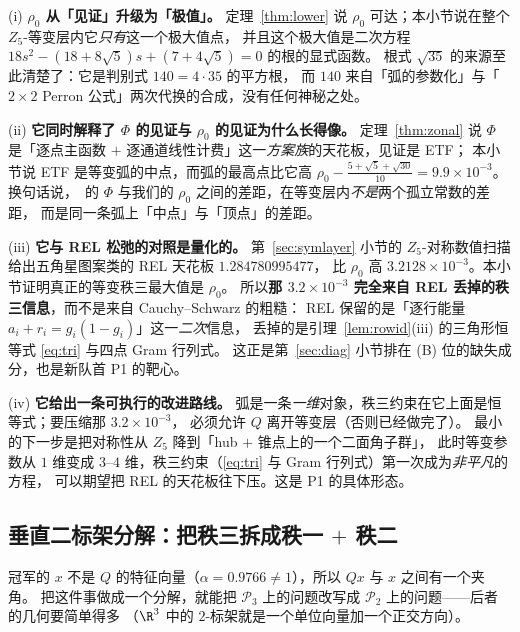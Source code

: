 \begin{remark}[这条定理在主线上意味着什么]\label{rmk:coneread}
(i) \textbf{$\rho_0$ 从「见证」升级为「极值」。}
定理~\ref{thm:lower} 说 $\rho_0$ 可达；本小节说在整个 $Z_5$-等变层内它\emph{只有}这一个极大值点，
并且这个极大值是二次方程 $18s^2-(18+8\sqrt5)s+(7+4\sqrt5)=0$ 的根的显式函数。
根式 $\sqrt{35}$ 的来源至此清楚了：它是判别式 $140=4\cdot35$ 的平方根，
而 $140$ 来自「弧的参数化」与「$2\times2$ Perron 公式」两次代换的合成，没有任何神秘之处。

(ii) \textbf{它同时解释了 $\Phi$ 的见证与 $\rho_0$ 的见证为什么长得像。}
定理~\ref{thm:zonal} 说 $\Phi$ 是「逐点主函数 $+$ 逐通道线性计费」这一\emph{方案族}的天花板，见证是 ETF；
本小节说 ETF 是等变弧的中点，而弧的最高点比它高 $\rho_0-\frac{5+\sqrt5+\sqrt{30}}{10}=9.9\times10^{-3}$。
换句话说，\STW\ 的 $\Phi$ 与我们的 $\rho_0$ 之间的差距，在等变层内\emph{不是}两个孤立常数的差距，
而是同一条弧上「中点」与「顶点」的差距。

(iii) \textbf{它与 REL 松弛的对照是量化的。}
第~\ref{sec:symlayer} 小节的 $Z_5$-对称数值扫描给出五角星图案类的 REL 天花板 $1.284780995477$，
比 $\rho_0$ 高 $3.2128\times10^{-3}$。本小节证明真正的等变秩三最大值是 $\rho_0$。
所以\textbf{那 $3.2\times10^{-3}$ 完全来自 REL 丢掉的秩三信息}，而不是来自 Cauchy--Schwarz 的粗糙：
REL 保留的是「逐行能量 $a_i+r_i=g_i(1-g_i)$」这一\emph{二次}信息，
丢掉的是引理~\ref{lem:rowid}(iii) 的三角形恒等式 \eqref{eq:tri} 与四点 Gram 行列式。
这正是第~\ref{sec:diag} 小节排在 (B) 位的缺失成分，也是新队首 P1 的靶心。

(iv) \textbf{它给出一条可执行的改进路线。}
弧是一条\emph{一维}对象，秩三约束在它上面是恒等式；要压缩那 $3.2\times10^{-3}$，
必须允许 $Q$ 离开等变层（否则已经做完了）。
最小的下一步是把对称性从 $Z_5$ 降到「hub $+$ 锥点上的一个二面角子群」，
此时等变参数从 $1$ 维变成 $3$--$4$ 维，秩三约束（\eqref{eq:tri} 与 Gram 行列式）第一次成为\emph{非平凡}的方程，
可以期望把 REL 的天花板往下压。这是 P1 的具体形态。
\end{remark}

\subsection{垂直二标架分解：把秩三拆成秩一 $+$ 秩二}\label{sec:perp2}

冠军的 $x$ 不是 $Q$ 的特征向量（$\alpha=0.9766\ne1$），所以 $Qx$ 与 $x$ 之间有一个夹角。
把这件事做成一个分解，就能把 $\mathcal P_3$ 上的问题改写成 $\mathcal P_2$ 上的问题——后者的几何要简单得多
（$\R^3$ 中的 $2$-标架就是一个单位向量加一个正交方向）。

